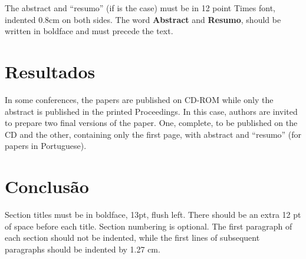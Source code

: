 \documentclass[12pt]{article}
\begin{document}
The abstract and ``resumo'' (if is the case) must be in 12 point Times font,
indented 0.8cm on both sides. The word \textbf{Abstract} and \textbf{Resumo},
should be written in boldface and must precede the text.

\section{Resultados}

In some conferences, the papers are published on CD-ROM while only the
abstract is published in the printed Proceedings. In this case, authors are
invited to prepare two final versions of the paper. One, complete, to be
published on the CD and the other, containing only the first page, with
abstract and ``resumo'' (for papers in Portuguese).

\section{Conclusão}

Section titles must be in boldface, 13pt, flush left. There should be an extra
12 pt of space before each title. Section numbering is optional. The first
paragraph of each section should not be indented, while the first lines of
subsequent paragraphs should be indented by 1.27 cm.



\end{document}

